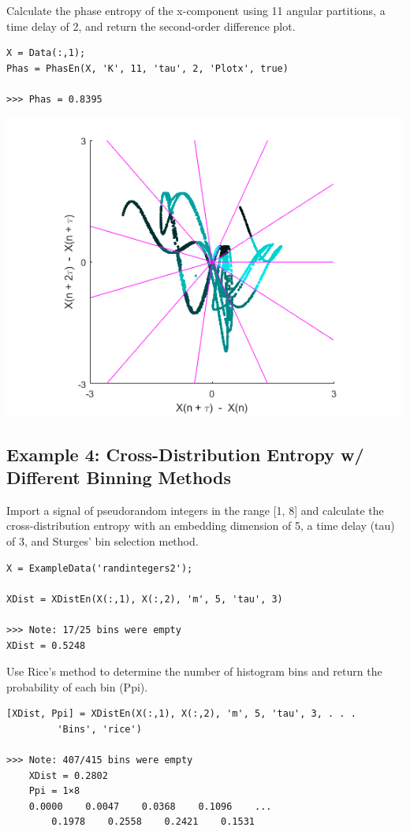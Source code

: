 \documentclass[12pt, a4paper, titlepage, openany]{book}
\begin{document}
Calculate the phase  entropy of the x-component using 11 angular partitions, a time delay of 2, and return the second-order difference plot.
\begin{verbatim}
X = Data(:,1);
Phas = PhasEn(X, 'K', 11, 'tau', 2, 'Plotx', true)

>>> Phas = 0.8395
\end{verbatim}
\includegraphics[scale=.65]{phasex2.png}


\newpage
\subsection{\normalsize Example 4: \hspace{15mm} Cross-Distribution Entropy w/ Different Binning Methods}
\noindent Import a signal of pseudorandom integers in the range [1, 8] and calculate the cross-distribution entropy with an embedding dimension of 5, a time delay (tau) of 3, and Sturges' bin selection method.
\begin{verbatim}
X = ExampleData('randintegers2');

XDist = XDistEn(X(:,1), X(:,2), 'm', 5, 'tau', 3)

>>> Note: 17/25 bins were empty
XDist = 0.5248
\end{verbatim}
Use Rice's method to determine the number of histogram bins and return the probability of each bin (Ppi).
\begin{verbatim}
[XDist, Ppi] = XDistEn(X(:,1), X(:,2), 'm', 5, 'tau', 3, . . .
		 'Bins', 'rice')

>>> Note: 407/415 bins were empty
	XDist = 0.2802
	Ppi = 1×8
    0.0000    0.0047    0.0368    0.1096    ...
    	0.1978    0.2558    0.2421    0.1531
\end{verbatim}
\end{document}
